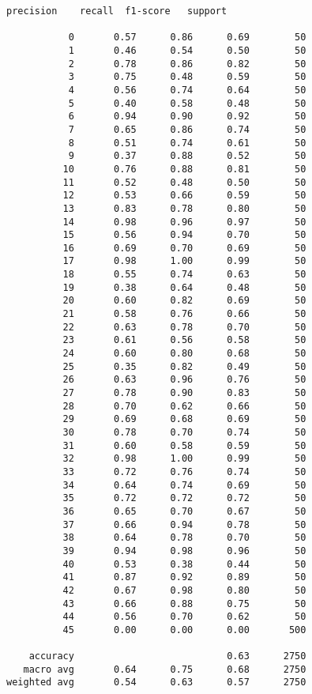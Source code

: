 \documentclass[11pt]{article}
\begin{document}
    \begin{Verbatim}[commandchars=\\\{\}]
              precision    recall  f1-score   support

           0       0.57      0.86      0.69        50
           1       0.46      0.54      0.50        50
           2       0.78      0.86      0.82        50
           3       0.75      0.48      0.59        50
           4       0.56      0.74      0.64        50
           5       0.40      0.58      0.48        50
           6       0.94      0.90      0.92        50
           7       0.65      0.86      0.74        50
           8       0.51      0.74      0.61        50
           9       0.37      0.88      0.52        50
          10       0.76      0.88      0.81        50
          11       0.52      0.48      0.50        50
          12       0.53      0.66      0.59        50
          13       0.83      0.78      0.80        50
          14       0.98      0.96      0.97        50
          15       0.56      0.94      0.70        50
          16       0.69      0.70      0.69        50
          17       0.98      1.00      0.99        50
          18       0.55      0.74      0.63        50
          19       0.38      0.64      0.48        50
          20       0.60      0.82      0.69        50
          21       0.58      0.76      0.66        50
          22       0.63      0.78      0.70        50
          23       0.61      0.56      0.58        50
          24       0.60      0.80      0.68        50
          25       0.35      0.82      0.49        50
          26       0.63      0.96      0.76        50
          27       0.78      0.90      0.83        50
          28       0.70      0.62      0.66        50
          29       0.69      0.68      0.69        50
          30       0.78      0.70      0.74        50
          31       0.60      0.58      0.59        50
          32       0.98      1.00      0.99        50
          33       0.72      0.76      0.74        50
          34       0.64      0.74      0.69        50
          35       0.72      0.72      0.72        50
          36       0.65      0.70      0.67        50
          37       0.66      0.94      0.78        50
          38       0.64      0.78      0.70        50
          39       0.94      0.98      0.96        50
          40       0.53      0.38      0.44        50
          41       0.87      0.92      0.89        50
          42       0.67      0.98      0.80        50
          43       0.66      0.88      0.75        50
          44       0.56      0.70      0.62        50
          45       0.00      0.00      0.00       500

    accuracy                           0.63      2750
   macro avg       0.64      0.75      0.68      2750
weighted avg       0.54      0.63      0.57      2750

\end{Verbatim}
\end{document}
